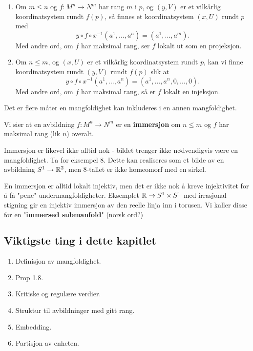 \documentclass[11pt, english]{article}
\begin{document}
\begin{prop}
\begin{enumerate}
\item Om $m \leq n$ og $f:M^n \to N^m$ har rang $m$ i $p$, og $(y,V)$ er et vilkårlig koordinatsystem rundt $f(p)$, så finnes et koordinatsystem $(x,U)$ rundt $p$ med
$$
y \circ f \circ x^{-1}(a^1, \ldots, a^n) = (a^1, \ldots, a^m).
$$
Med andre ord, om $f$ har maksimal rang, ser $f$ lokalt ut som en projeksjon.
\item Om $n \leq m$, og $(x,U)$ er et vilkårlig koordinatsystem rundt $p$, kan vi finne koordinatsystem rundt $(y,V)$ rundt $f(p)$ slik at
$$
y \circ f \circ x^{-1}(a^1,\ldots, a^n ) = (a^1, \ldots, a^n, 0,\ldots,0).
$$
Med andre ord, om $f$ har maksimal rang, så er $f$ lokalt en injeksjon.
\end{enumerate}
\end{prop}

Det er flere måter en mangfoldighet kan inkluderes i en annen mangfoldighet. 

Vi sier at en avbildning $f:M^n \to N^m $ er en \textbf{immersjon} om $n \leq m$ og $f$ har maksimal rang (lik $n$) overalt.

Immersjon er likevel ikke alltid nok - bildet trenger ikke nødvendigvis være en mangfoldighet. Ta for eksempel $8$. Dette kan realiseres som et bilde av en avbildning $S^1 \to \mathbb{R}^2$, men $8$-tallet er ikke homeomorf med en sirkel. 

En immersjon er alltid lokalt injektiv, men det er ikke nok å kreve injektivitet for å få "pene" undermangfoldigheter. Eksemplet $\mathbb{R} \to S^1 \times S^1$ med irrasjonal stigning gir en injektiv immersjon av den reelle linja inn i torusen. Vi kaller disse for en "\textbf{immersed submanfold}" (norsk ord?) 



\subsection{Viktigste ting i dette kapitlet}

\begin{enumerate}
\item Definisjon av mangfoldighet.
\item Prop 1.8.
\item Kritiske og regulære verdier.
\item Struktur til avbildninger med gitt rang. 
\item Embedding.
\item Partisjon av enheten.
\end{enumerate}
\end{document}
